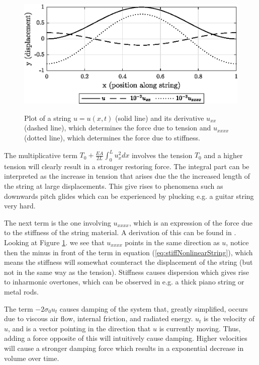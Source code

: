 \documentclass{article}
\begin{document}
\begin{figure}[h]
  \includegraphics[width=\linewidth]{diffplot.eps}
  \label{fig:diffplot}
  \caption{Plot of a string $u = u(x,t)$ (solid line) and its derivative $u_{xx}$ (dashed line), which determines the force due to tension and $u_{xxxx}$ (dotted line), which determines the force due to stiffness.}
\end{figure}

\noindent The multiplicative term $T_0 + \frac{E A}{2L} \int_0^L u_x^2 dx$ involves the tension $T_0$ and a higher tension will clearly result in a stronger restoring force.
The integral part can be interpreted as the increase in tension that arises due the the increased length of the string at large displacements\cite[Chapter~5]{fletcher_physics_1998}.
This give rises to phenomena such as downwards pitch glides which can be experienced by plucking e.g. a guitar string very hard.

The next term is the one involving $u_{xxxx}$, which is an expression of the force due to the stiffness of the string material.
A derivation of this can be found in \cite[Chapter~2]{fletcher_physics_1998}.
Looking at Figure \ref{fig:diffplot}. we see that $u_{xxxx}$ points in the same direction as $u$, notice then the minus in front of the term in equation (\ref{eq:stiffNonlinearString}), which means the stiffness will somewhat counteract the displacement of the string (but not in the same way as the tension).
Stiffness causes dispersion which gives rise to inharmonic overtones, which can be observed in e.g. a thick piano string or metal rods.

The term $-2 \sigma_0 u_t$ causes damping of the system that, greatly simplified, occurs due to viscous air flow, internal friction, and radiated energy\cite[Chapter~2]{fletcher_physics_1998}. 
$u_t$ is the velocity of $u$, and is a vector pointing in the direction that $u$ is currently moving. Thus, adding a force opposite of this will intuitively cause damping.
Higher velocities will cause a stronger damping force which results in a exponential decrease in volume over time.
\end{document}
